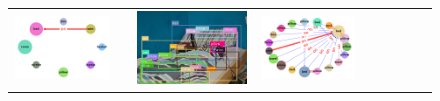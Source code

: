 \begin{figure}
\begin{tabular}{p{0.3cm}|rc|p{0.1cm}rc|p{0.1cm}rc}
		\includegraphics[width=\figwidthvis, align=c]{2326876_baseline_zs_graph_gt.png} & & \includegraphics[width=\figwidthvis, align=c]{2326876_baseline_zs_baseline.png} &
		\includegraphics[width=\figwidthvis, align=c]{2326876_baseline_zs_graph_baseline.png} & 

\end{tabular}
\end{figure}
